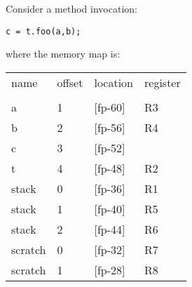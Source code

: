 \begin{slide*}
Consider a method invocation:\\

\begin{verbatim}
c = t.foo(a,b);

\end{verbatim}

where the memory map is:\\
\begin{center}
\begin{scriptsize}
\begin{tt}
\begin{tabular}{l@{~~~}l@{~~~}l@{~~~}l}
name & offset & location & register\\ \\
a & 1 & [fp-60] & R3 \\
b & 2 & [fp-56] & R4 \\
c & 3 & [fp-52] & \\
t & 4 & [fp-48] & R2\\
stack & 0 & [fp-36] & R1 \\
stack & 1 & [fp-40] & R5 \\
stack & 2 & [fp-44] & R6 \\
scratch & 0 & [fp-32] & R7\\
scratch & 1 & [fp-28] & R8
\end{tabular}
\end{tt}
\end{scriptsize}
\end{center}
\vfil
\end{slide*}


